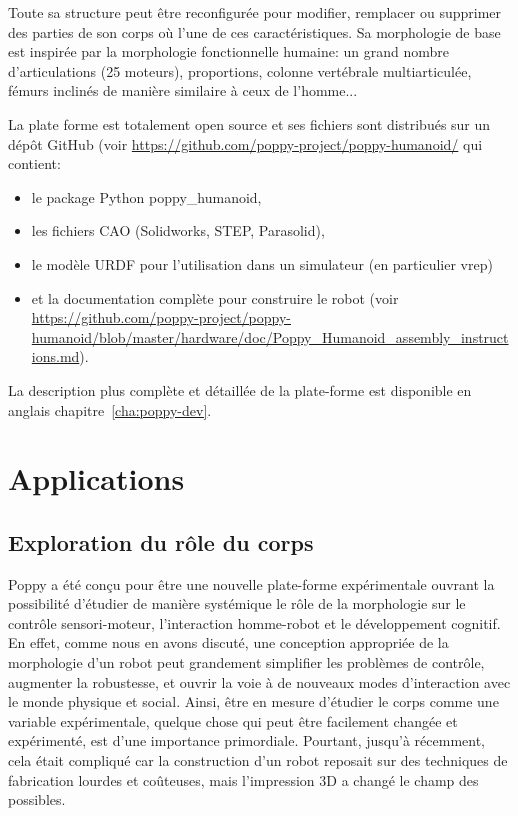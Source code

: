 Toute sa structure peut être reconfigurée pour modifier, remplacer ou supprimer des parties de son corps où l'une de ces caractéristiques. Sa morphologie de base est inspirée par la morphologie fonctionnelle humaine: un grand nombre d'articulations (25 moteurs), proportions, colonne vertébrale multiarticulée, fémurs inclinés de manière similaire à ceux de l'homme...


La plate forme est totalement open source et ses fichiers sont distribués sur un dépôt GitHub (voir \url{https://github.com/poppy-project/poppy-humanoid/} qui contient:

\begin{itemize}
  \item le package Python poppy\_humanoid,
  \item les fichiers CAO (Solidworks, STEP, Parasolid),
  \item le modèle URDF pour l'utilisation dans un simulateur (en particulier vrep) 
  \item et la documentation complète pour construire le robot (voir \url{https://github.com/poppy-project/poppy-humanoid/blob/master/hardware/doc/Poppy_Humanoid_assembly_instructions.md}).
\end{itemize}

La description plus complète et détaillée de la plate-forme est disponible en anglais chapitre~\ref{cha:poppy-dev}.



\section*{Applications} %


\subsection*{Exploration du rôle du corps} %
Poppy a été conçu pour être une nouvelle plate-forme expérimentale ouvrant la possibilité d'étudier de manière systémique le rôle de la morphologie sur le contrôle sensori-moteur, l'interaction homme-robot et le développement cognitif. En effet, comme nous en avons discuté, une conception appropriée de la morphologie d'un robot peut grandement simplifier les problèmes de contrôle, augmenter la robustesse, et ouvrir la voie à de nouveaux modes d'interaction avec le monde physique et social. Ainsi, être en mesure d'étudier le corps comme une variable expérimentale, quelque chose qui peut être facilement changée et expérimenté, est d'une importance primordiale. Pourtant, jusqu'à récemment, cela était compliqué car la construction d'un robot reposait sur des techniques de fabrication lourdes et coûteuses, mais l'impression 3D a changé le champ des possibles.

